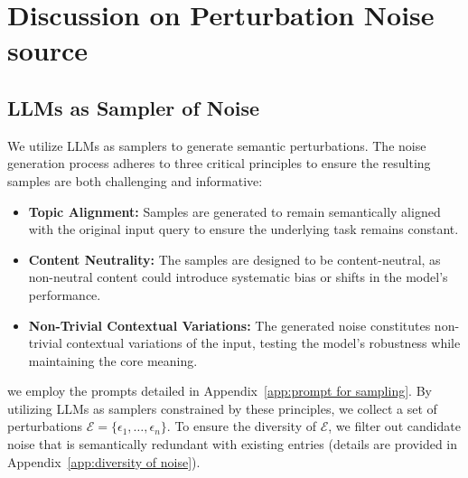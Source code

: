 \documentclass[11pt]{article}
\theoremstyle{plain}
\theoremstyle{definition}
\theoremstyle{remark}
\begin{document}


\clearpage
\appendix

\section{Discussion on Perturbation Noise source}\label{app:Discussion on Perturbation Noise source}


\subsection{LLMs as Sampler of Noise}\label{app:LLMs as Sampler of Noise}


We utilize LLMs as samplers to generate semantic perturbations. The noise generation process adheres to three critical principles to ensure the resulting samples are both challenging and informative:

\begin{itemize}
    \item \textbf{Topic Alignment:} Samples are generated to remain semantically aligned with the original input query to ensure the underlying task remains constant.
    \item \textbf{Content Neutrality:} The samples are designed to be content-neutral, as non-neutral content could introduce systematic bias or shifts in the model's performance.
    \item \textbf{Non-Trivial Contextual Variations:} The generated noise constitutes non-trivial contextual variations of the input, testing the model's robustness while maintaining the core meaning.
\end{itemize}

we employ the prompts detailed in Appendix~\ref{app:prompt for sampling}. By utilizing LLMs as samplers constrained by these principles, 
we collect a set of perturbations $\mathcal{E} = \{\epsilon_1, \dots, \epsilon_n\}$. 
To ensure the diversity of $\mathcal{E}$, we filter out candidate noise that is semantically redundant with existing entries (details are provided in Appendix~\ref{app:diversity of noise}).
\end{document}
